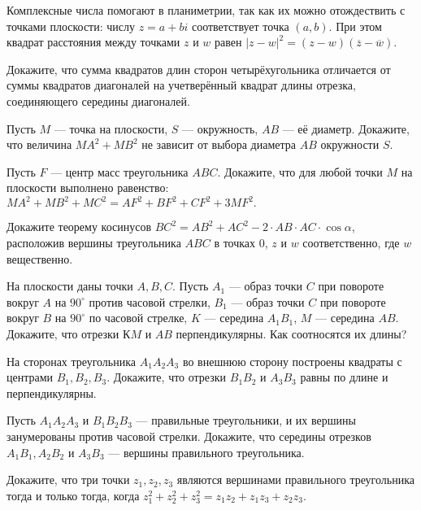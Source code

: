 \documentclass[a4paper,11pt]{article}
\begin{document}
\newcommand{\0}[1]{\overline{#1}}




{%
\small
Комплексные числа помогают в планиметрии, так как их можно
отождествить с точками плоскости: числу $z=a+bi$ соответствует точка
$(a,b)$. При этом квадрат расстояния между точками $z$
и $w$ равен $|z-w|^2=(z-w)(\0 z-\0 w)$.


}

\medskip

 Докажите, что сумма квадратов длин сторон четырёхугольника
отличается от суммы квадратов диагоналей на учетверённый квадрат
длины отрезка, соединяющего середины диагоналей.

 Пусть $M$ --- точка на плоскости, $S$ --- окружность,
$AB$ --- её диаметр. Докажите, что величина $MA^2+MB^2$
не зависит от выбора диаметра $AB$ окружности $S$.

 Пусть $F$ --- центр масс %
треугольника $ABC$. Докажите, что для любой точки $M$ на
плоскости выполнено равенство: $MA^2+MB^2+MC^2=AF^2+BF^2+CF^2+3MF^2.$

Докажите теорему косинусов $BC^2=AB^2+AC^2-2\cdot AB\cdot AC\cdot\cos\alpha$, расположив вершины треугольника $ABC$ в точках $0$, $z$ и $w$ соответственно, где $w$ вещественно.





 На плоскости даны точки $A,B,C$. Пусть $A_1$ --- образ
точки
$C$ при повороте вокруг $A$ на $90^{\circ}$ против часовой
стрелки,
$B_1$ --- образ точки $C$ при повороте вокруг $B$ на
$90^{\circ}$
по часовой стрелке, $K$ --- середина $A_1B_1$, $M$ --- середина
$AB$.
Докажите, что отрезки $КM$ и $AB$ перпендикулярны. Как соотносятся их
длины?

 На сторонах треугольника $A_1A_2A_3$ во внешнюю сторону
построены
квадраты с центрами $B_1, B_2, B_3$. Докажите, что отрезки $B_1B_2$ и
$A_3B_3$ равны по длине и перпендикулярны.

 Пусть $A_1A_2A_3$ и $B_1B_2B_3$ --- правильные треугольники,
и их вершины занумерованы %
против часовой стрелки.
Докажите,
что середины отрезков $A_1B_1, A_2B_2$ и $A_3B_3$ --- вершины
правильного
треугольника.

 Докажите, что три точки $z_1,z_2,z_3$ являются вершинами
правильного треугольника тогда и только тогда, когда
$z_1^2+z_2^2+z_3^2=z_1z_2+z_1z_3+z_2z_3$.
\end{document}
